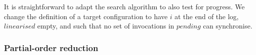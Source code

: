 

It is straightforward to adapt the search algorithm to also test for progress.
We change the definition of a target configuration to have $i$ at the end of
the log, $linearised$ empty, and such that no set of invocations in $pending$
can synchronise.  





\subsubsection{Partial-order reduction}


